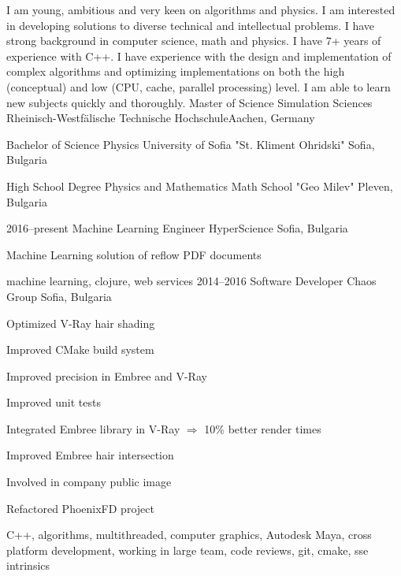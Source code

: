 I am young, ambitious and very keen on algorithms and physics. I am interested
in developing solutions to diverse technical and intellectual
problems. I have strong background in computer science, math and physics. I
have 7+ years of experience with C++. I have experience with the design and
implementation of complex algorithms and optimizing implementations on both the
high (conceptual) and low (CPU, cache, parallel processing) level. I am able
to learn new subjects quickly and thoroughly.
{Master of Science}
{Simulation Sciences}
{Rheinisch-Westfälische Technische Hochschule}{Aachen, Germany}

{Bachelor of Science}
{Physics}
{University of Sofia "St. Kliment Ohridski"}
{Sofia, Bulgaria}

{High School Degree}
{Physics and Mathematics}
{Math School "Geo Milev"}
{Pleven, Bulgaria}

\myjobbb
{2016--present}
{Machine Learning Engineer}
{HyperScience}
{Sofia, Bulgaria}
{ \item Machine Learning solution of reflow PDF documents}
{machine learning, clojure, web services}
\myjobb
{2014--2016}
{Software Developer}
{Chaos Group}
{Sofia, Bulgaria}
{
\item Optimized V-Ray hair shading
\item Improved CMake build system 
\item Improved precision in Embree and V-Ray
\item Improved unit tests
}
{
\item Integrated Embree library in V-Ray $\Rightarrow$ 10\% better render times 
\item Improved Embree hair intersection 
\item Involved in company public image
\item Refactored PhoenixFD project
}
{C++, algorithms, multithreaded, computer graphics, Autodesk Maya, cross platform development, working in large team, code reviews, git, cmake, sse intrinsics}

